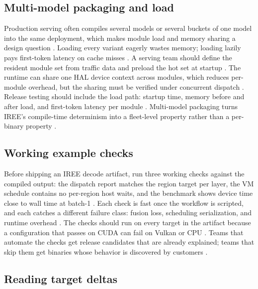 \subsection{Multi-model packaging and load}

Production serving often compiles several models or several buckets of one model into the same deployment, which makes module load and memory sharing a design question \citep{kwon2023vllm,iree2024}. Loading every variant eagerly wastes memory; loading lazily pays first-token latency on cache misses \citep{patel2025llminference,memoryfloor2026}. A serving team should define the resident module set from traffic data and preload the hot set at startup \citep{chen2020compilerbasedhardw,taxbreak2026}. The runtime can share one HAL device context across modules, which reduces per-module overhead, but the sharing must be verified under concurrent dispatch \citep{iree2024,patel2025llminference}. Release testing should include the load path: startup time, memory before and after load, and first-token latency per module \citep{memoryfloor2026,iree2024}. Multi-model packaging turns IREE's compile-time determinism into a fleet-level property rather than a per-binary property \citep{kwon2023vllm,chen2020compilerbasedhardw}.

\subsection{Working example checks}

Before shipping an IREE decode artifact, run three working checks against the compiled output: the dispatch report matches the region target per layer, the VM schedule contains no per-region host waits, and the benchmark shows device time close to wall time at batch-1 \citep{iree2024,taxbreak2026,memoryfloor2026}. Each check is fast once the workflow is scripted, and each catches a different failure class: fusion loss, scheduling serialization, and runtime overhead \citep{patel2025llminference,chen2020compilerbasedhardw}. The checks should run on every target in the artifact because a configuration that passes on CUDA can fail on Vulkan or CPU \citep{iree2024,amd2024aie}. Teams that automate the checks get release candidates that are already explained; teams that skip them get binaries whose behavior is discovered by customers \citep{memoryfloor2026,patel2025llminference}.

\subsection{Reading target deltas}

